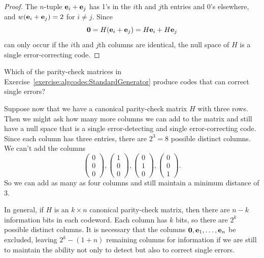  
\begin{proof}
The $n$-tuple ${\bold e}_{i} +{\bold e}_{j}$ has 1's in the $i$th and
$j$th entries and 0's elsewhere, and $w( {\bold e}_{i} +{\bold
e}_{j}) = 2$ for $i \neq j$. Since
\[
{\bold 0}
= H({\bold e}_{i} +{\bold e}_{j})
= H{\bold e}_{i} + H{\bold e}_{j}
\]
can only occur if the $i$th and $j$th columns are identical, the
null space of $H$ is a single error-correcting code.
\end{proof}
 
 \begin{exercise}{}
 Which of the parity-check matrices in Exercise~\ref{exercise:algcodes:StandardGenerator} produce codes that can correct single errors?
 \end{exercise}
 
Suppose now that we have a canonical parity-check matrix $H$ with
three rows. Then we might ask how many more columns we can add to
the matrix and still have a null space that is a single
error-detecting and single error-correcting code. Since each column
has three entries, there are $2^3 = 8$ possible distinct columns. We
can't add the columns 
\[
\left(
\begin{array}{c} 0 \\ 0 \\ 0 \end{array}
\right),
\left(
\begin{array}{c} 1 \\ 0 \\ 0 \end{array}
\right),
\left(
\begin{array}{c} 0 \\ 1 \\ 0 \end{array}
\right),
\left(
\begin{array}{c} 0 \\ 0 \\ 1 \end{array}
\right).
\]
So we can add as many as four columns and still maintain a minimum
distance of 3. 
 
 
In general, if $H$ is an $k \times n$ canonical parity-check matrix,
then there are $n-k$ information bits in each codeword. Each
column has $k$ bits, so there are $2^k$ possible distinct columns.
It is necessary that the columns ${\bold 0}, {\bold e}_1, \ldots,
{\bold e}_n$ be excluded, leaving $2^k - (1 + n)$ remaining columns for
information if we are still to maintain the ability not only to detect
but also to correct single errors. 
 
